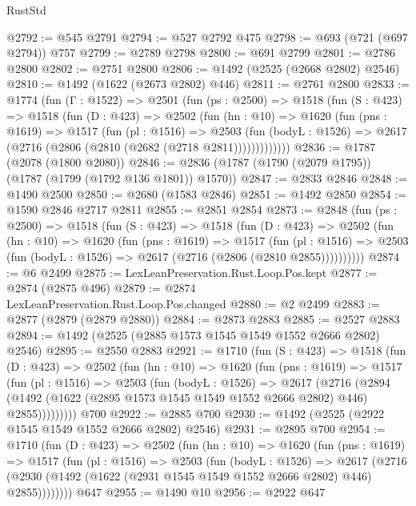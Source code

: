 \begin{lexlean}{RustStd}
\begin{coremodule}
@2792 := @545 @2791
@2794 := @527 @2792 @475
@2798 := @693 (@721 (@697 @2794)) @757
@2799 := @2789 @2798
@2800 := @691 @2799
@2801 := @2786 @2800
@2802 := @2751 @2800
@2806 := @1492 (@2525 (@2668 @2802) @2546)
@2810 := @1492 (@1622 (@2673 @2802) @446)
@2811 := @2761 @2800
@2833 := @1774
    (fun (Γ : @1522) =>
    @2501
      (fun (ps : @2500) =>
      @1518
        (fun (S : @423) =>
        @1518
          (fun (D : @423) =>
          @2502
            (fun (hn : @10) =>
            @1620
              (fun (pns : @1619) =>
              @1517
                (fun (pl : @1516) =>
                @2503
                  (fun (bodyL : @1526) =>
                  @2617 (@2716 (@2806 (@2810 (@2682 (@2718 @2811)))))))))))))
@2836 := @1787 (@2078 (@1800 @2080))
@2846 := @2836 (@1787 (@1790 (@2079 @1795)) (@1787 (@1799 (@1792 @136 @1801)) @1570))
@2847 := @2833 @2846
@2848 := @1490 @2500
@2850 := @2680 (@1583 @2846)
@2851 := @1492 @2850
@2854 := @1590 @2846 @2717 @2811
@2855 := @2851 @2854
@2873 := @2848
    (fun (ps : @2500) =>
    @1518
      (fun (S : @423) =>
      @1518
        (fun (D : @423) =>
        @2502
          (fun (hn : @10) =>
          @1620
            (fun (pns : @1619) =>
            @1517
              (fun (pl : @1516) =>
              @2503 (fun (bodyL : @1526) => @2617 (@2716 (@2806 (@2810 @2855))))))))))
@2874 := @6 @2499
@2875 := LexLeanPreservation.Rust.Loop.Pos.kept
@2877 := @2874 (@2875 @496)
@2879 := @2874 LexLeanPreservation.Rust.Loop.Pos.changed
@2880 := @2 @2499
@2883 := @2877 (@2879 (@2879 @2880))
@2884 := @2873 @2883
@2885 := @2527 @2883
@2894 := @1492 (@2525 (@2885 @1573 @1545 @1549 @1552 @2666 @2802) @2546)
@2895 := @2550 @2883
@2921 := @1710
    (fun (S : @423) =>
    @1518
      (fun (D : @423) =>
      @2502
        (fun (hn : @10) =>
        @1620
          (fun (pns : @1619) =>
          @1517
            (fun (pl : @1516) =>
            @2503
              (fun (bodyL : @1526) =>
              @2617
                (@2716
                  (@2894
                    (@1492 (@1622 (@2895 @1573 @1545 @1549 @1552 @2666 @2802) @446) @2855)))))))))
    @700
@2922 := @2885 @700
@2930 := @1492 (@2525 (@2922 @1545 @1549 @1552 @2666 @2802) @2546)
@2931 := @2895 @700
@2954 := @1710
    (fun (D : @423) =>
    @2502
      (fun (hn : @10) =>
      @1620
        (fun (pns : @1619) =>
        @1517
          (fun (pl : @1516) =>
          @2503
            (fun (bodyL : @1526) =>
            @2617
              (@2716 (@2930 (@1492 (@1622 (@2931 @1545 @1549 @1552 @2666 @2802) @446) @2855))))))))
    @647
@2955 := @1490 @10
@2956 := @2922 @647

\end{coremodule}
\end{lexlean}
